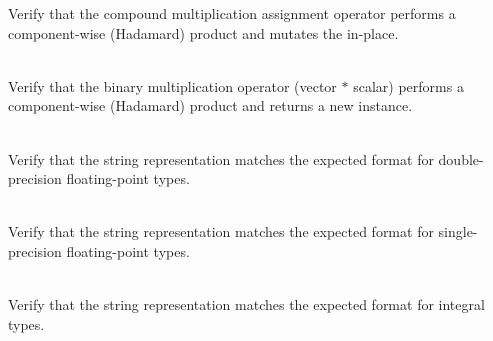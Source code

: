 \begin{DoxyRefList}
\label{test__test000029}%
%
Verify that the compound multiplication assignment operator performs a component-\/wise (Hadamard) product and mutates the  in-\/place.  
\item[{\parbox[t]{\linewidth}{Member \doxylink{group___f_g_m___vec4___multiplication_ga939ff05d1b334caedd7c72a9874e76e9}{Vector4\+DScalar\+Multiplication\+\_\+\+Vector\+Times\+Scalar\+Returns\+Scaled\+Vector} ()}}]\hfill \\
\label{test__test000027}%
%
Verify that the binary multiplication operator (vector \texorpdfstring{$\ast$}{*} scalar) performs a component-\/wise (Hadamard) product and returns a new  instance.  
\item[{\parbox[t]{\linewidth}{Member \doxylink{group___f_g_m___vec4___string___repr_ga9b7080213a8d6362ec62c398584222e7}{Vector4\+DString\+Representation\+Tests\+\_\+\+Double\+Representation} ()}}]\hfill \\
\label{test__test000148}%
%
Verify that the  string representation matches the expected format for double-\/precision floating-\/point types.  
\item[{\parbox[t]{\linewidth}{Member \doxylink{group___f_g_m___vec4___string___repr_ga9d2a7d25daf05938b1df56cf3920e0a2}{Vector4\+DString\+Representation\+Tests\+\_\+\+Float\+Representation} ()}}]\hfill \\
\label{test__test000147}%
%
Verify that the  string representation matches the expected format for single-\/precision floating-\/point types.  
\item[{\parbox[t]{\linewidth}{Member \doxylink{group___f_g_m___vec4___string___repr_ga17c5a9211d86b56952b1bc4405400c02}{Vector4\+DString\+Representation\+Tests\+\_\+\+Integral\+Representation} ()}}]\hfill \\
\label{test__test000146}%
%
Verify that the  string representation matches the expected format for integral types.  
\item[{\parbox[t]{\linewidth}{Member \doxylink{group___f_g_m___vec4___subtraction_ga7f719a61564eef711249f2d8aa8b55c9}{Vector4\+DSubtraction\+\_\+\+Minus\+Equals\+Operator\+\_\+\+Returns\+Same\+Vector\+With\+Difference} ()}}]\hfill \\

\end{DoxyRefList}
